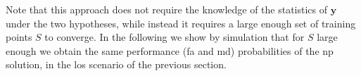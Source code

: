 \documentclass[conference]{IEEEtran}
\begin{document}
Note that this approach does not require the knowledge of the statistics of $\bm{y}$ under the two hypotheses, while instead it requires a large enough set of training points $S$ to converge. In the following we show by simulation that for $S$ large enough we obtain the same performance (\ac{fa} and \ac{md}) probabilities of the \ac{np} solution, in the \ac{los} scenario of the previous section.


\end{document}
